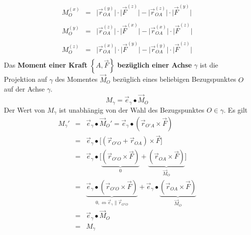 \begin{equation}
\boxed{
\begin{array}{lll}
M_O^{\left(x\right)}&=&\Big\vert\overrightarrow{r}_{OA}^{\left(y\right)}\Big\vert\cdot \Big\vert\overrightarrow{F}^{\left(z\right)}\Big\vert-\Big\vert\overrightarrow{r}_{OA}^{\left(z\right)}\Big\vert\cdot \Big\vert\overrightarrow{F}^{\left(y\right)}\Big\vert\\\\
M_O^{\left(y\right)}&=&\Big\vert\overrightarrow{r}_{OA}^{\left(z\right)}\Big\vert\cdot \Big\vert\overrightarrow{F}^{\left(x\right)}\Big\vert-\Big\vert\overrightarrow{r}_{OA}^{\left(x\right)}\Big\vert\cdot \Big\vert\overrightarrow{F}^{\left(z\right)}\Big\vert\\\\
M_O^{\left(z\right)}&=&\Big\vert\overrightarrow{r}_{OA}^{\left(x\right)}\Big\vert\cdot \Big\vert\overrightarrow{F}^{\left(y\right)}\Big\vert-\Big\vert\overrightarrow{r}_{OA}^{\left(y\right)}\Big\vert\cdot \Big\vert\overrightarrow{F}^{\left(z\right)}\Big\vert\\
\end{array}}
\end{equation}
Das \textbf{Moment einer Kraft} $\left\{A, \overrightarrow{F}\right\}$ \textbf{bezüglich einer Achse} $\gamma$ ist die Projektion auf $\gamma$ des Momentes $\overrightarrow{M}_O$ bezüglich eines beliebigen Bezugspunktes $O$ auf der Achse $\gamma$.
\begin{equation}
\boxed{M_{\gamma}=\overrightarrow{e}_{\gamma}\bullet \overrightarrow{M}_O}
\end{equation}
Der Wert von $M_{\gamma}$ ist unabhängig von der Wahl des Bezugspunktes $O\in \gamma$. Es gilt
\begin{equation}
\boxed{\begin{array}{lll}
M_{\gamma}'&=&\overrightarrow{e}_{\gamma}\bullet \overrightarrow{M}_O'=\overrightarrow{e}_{\gamma}\bullet \left(\overrightarrow{r}_{O'A}\times \overrightarrow{F}\right)\\
&=&\overrightarrow{e}_{\gamma}\bullet \Big[\left(\overrightarrow{r}_{O'O}+\overrightarrow{r}_{OA}\right)\times \overrightarrow{F}\Big]\\
&=&\overrightarrow{e}_{\gamma}\bullet \Big[\underbrace{\left(\overrightarrow{r}_{O'O}\times \overrightarrow{F}\right)}_{0}+\underbrace{\left(\overrightarrow{r}_{OA}\times \overrightarrow{F}\right)}_{\overrightarrow{M}_O}\Big]\\
&=&\underbrace{\overrightarrow{e}_{\gamma}\bullet \left(\overrightarrow{r}_{O'O}\times \overrightarrow{F}\right)}_{0,\Longleftrightarrow\overrightarrow{e}_{\gamma}\parallel \overrightarrow{r}_{O'O}}+\overrightarrow{e}_{\gamma}\bullet\underbrace{\left(\overrightarrow{r}_{OA}\times \overrightarrow{F}\right)}_{\overrightarrow{M}_O}\\
&=&\overrightarrow{e}_{\gamma}\bullet \overrightarrow{M}_O\\
&=&M_{\gamma}
\end{array}}
\end{equation}
